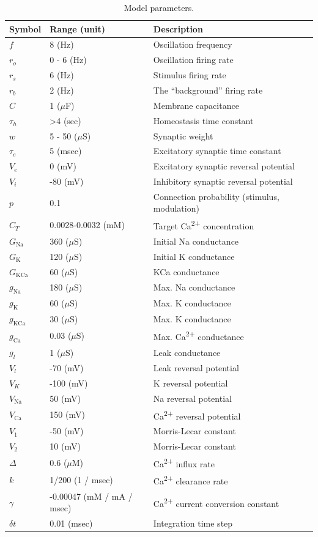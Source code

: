 \documentclass{article}
\begin{document}
\newpage
\begin{table}
\centering
\begin{tabular}{@{}lll@{}}
\toprule
\textbf{Symbol} & \textbf{Range (unit)} & \textbf{Description} \\ \midrule
$f$ & 8 (Hz) & Oscillation frequency \\
$r_o$ & 0 - 6 (Hz) & Oscillation firing rate \\
$r_s$ & 6 (Hz) & Stimulus firing rate \\
$r_b$ & 2 (Hz) & The ``background'' firing rate \\
$C$ & 1 ($\mu$F) & Membrane capacitance \\
$\tau_h$ & \textgreater 4 (sec) & Homeostasis time constant \\
$w$ & 5 - 50 ($\mu$S) & Synaptic weight \\
$\tau_e$ & 5 (msec) & Excitatory synaptic time constant \\
$V_e$ & 0 (mV) & Excitatory synaptic reversal potential \\
$V_i$ & -80 (mV) & Inhibitory synaptic reversal potential \\
$p$ & 0.1 & Connection probability (stimulus, modulation) \\
$C_T$ & 0.0028-0.0032 (mM) & Target Ca\textsuperscript{2+} concentration \\
$G_\text{Na}$ & 360 ($\mu$S) & Initial Na conductance \\
$G_\text{K}$ & 120 ($\mu$S) & Initial K conductance \\
$G_\text{KCa}$ & 60 ($\mu$S) & KCa conductance \\
$g_\text{Na}$ & 180 ($\mu$S) & Max. Na conductance \\
$g_\text{K}$ & 60 ($\mu$S) & Max. K conductance \\
$g_\text{KCa}$ & 30 ($\mu$S) & Max. K conductance \\
$g_\text{Ca}$ & 0.03 ($\mu$S) & Max. Ca\textsuperscript{2+} conductance \\
$g_l$ & 1 ($\mu$S) & Leak conductance \\
$V_l$ & -70 (mV) & Leak reversal potential \\
$V_K$ & -100 (mV) & K reversal potential \\
$V_\text{Na}$ & 50 (mV) & Na reversal potential \\
$V_\text{Ca}$ & 150 (mV) & Ca\textsuperscript{2+} reversal potential \\
$V_\text{1}$ & -50 (mV) & Morris-Lecar constant \\
$V_\text{2}$ & 10 (mV) & Morris-Lecar constant \\
$\Delta$ & 0.6 ($\mu$M) & Ca\textsuperscript{2+} influx rate \\
$k$ & 1/200 (1 / msec) & Ca\textsuperscript{2+} clearance rate \\
$\gamma$ & -0.00047 (mM / mA / msec) & Ca\textsuperscript{2+} current conversion constant \\
$\delta t$ & 0.01 (msec) & Integration time step \\ \bottomrule
\end{tabular}
\caption{Model parameters.}
\label{table:params}
\end{table}

\newpage


\end{document}
